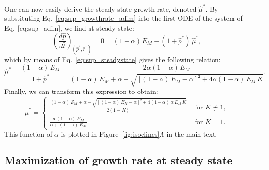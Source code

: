 One can now easily derive the steady-state growth rate, denoted $\hat{\mu}^*$.
By substituting Eq.~\ref{eq:sup_growthrate_adim} into the first ODE of the system of Eq.~\ref{eq:sup_adim}, we find at steady state:
\[
\left(\frac{d\hat{p}}{d\hat{t}}\right)_{(\hat{p}^*, \hat{r}^*)} = 0 = (1-\alpha)\, E_M - (1+\hat{p}^*)\, \hat{\mu}^*,
\]
which by means of Eq.~\ref{eq:sup_steadystate} gives the following relation:
\begin{equation}
\label{eq:sup_growthrate_p}
\hat{\mu}^* = \frac{(1-\alpha)\, E_M}{1+\hat{p}^*} = \frac{2\alpha(1-\alpha)\, E_M}{(1-\alpha)\, E_M + \alpha + \sqrt{\left[(1-\alpha)\, E_M -\alpha\right]^2 + 4\alpha(1-\alpha)\, E_M\, K}}.
\end{equation}
Finally, we can transform this expression to obtain:
\begin{equation}
\label{eq:sup_growthrate_final}
\hat{\mu}^* = \begin{cases}
\frac{(1-\alpha)\, E_M + \alpha - \sqrt{\left[(1-\alpha)\, E_M - \alpha\right]^2 + 4(1-\alpha)\, \alpha\, E_M\, K}}{2(1-K)} &\text{ for }K\neq 1,\\
\frac{\alpha\, (1-\alpha)\, E_M}{\alpha + (1-\alpha)\, E_M} &\text{ for }K = 1.
\end{cases}
\end{equation}
This function of $\alpha$ is plotted in Figure~\ref{fig:isoclines}\textit{A} in the main text.

\subsection{Maximization of growth rate at steady state}
\label{si::optimal}

